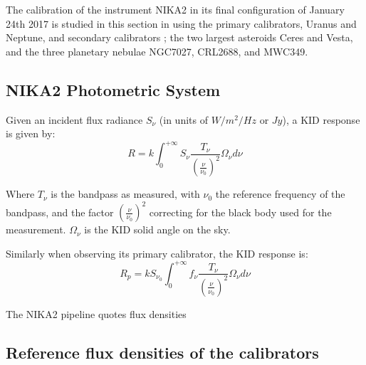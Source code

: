 %


The calibration of the instrument NIKA2 in its final configuration
of January 24th 2017  is studied in this section  in using the 
 primary calibrators, Uranus and Neptune, and secondary calibrators ; the two largest asteroids Ceres and Vesta, and the three
planetary nebulae NGC7027, CRL2688, and MWC349.

\subsection{NIKA2 Photometric System}

Given an incident flux radiance $S_{\nu}$ (in units of $W/m^{2}/Hz$ or $Jy$), a
KID response is given by: 
\begin{equation}
R = k \int_{0}^{+\infty} S_{\nu}
\frac{T_{\nu}}{\left(\frac{\nu}{\nu_{0}}\right)^{2}} \Omega_{\nu} d\nu
\end{equation}

Where $T_{\nu}$ is the bandpass as measured, with $\nu_{0}$ the
reference frequency of the bandpass, and the factor
$\left(\frac{\nu}{\nu_{0}}\right)^2$ correcting for the black body
used for the measurement. $\Omega_{\nu}$ is the KID
solid angle on the sky.  

Similarly when observing its primary calibrator, the KID response is:
\begin{equation}
R_{p} = k S_{\nu_{0}} \int_{0}^{+\infty} f_{\nu}
\frac{T_{\nu}}{\left(\frac{\nu}{\nu_{0}}\right)^{2}} \Omega_{\nu} d\nu
\end{equation}

The NIKA2 pipeline quotes flux densities


\subsection{Reference flux densities of the calibrators}

